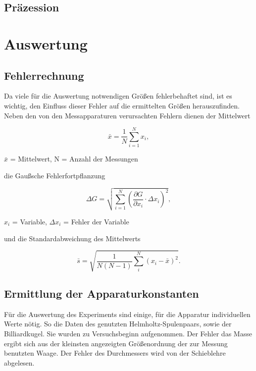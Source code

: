 \subsection{Präzession}



\section{Auswertung}
\subsection{Fehlerrechnung}
Da viele für die Auswertung notwendigen Größen fehlerbehaftet sind, ist es wichtig, den Einfluss dieser Fehler auf die ermittelten
Größen herauszufinden. Neben den von den Messapparaturen verursachten Fehlern dienen der Mittelwert

\begin{formel}
\begin{equation}
 \bar{x} = \frac1N \sum_{i=1}^{N} x_i,
\end{equation}
\caption*{\small{$\bar{x}$ = Mittelwert, N = Anzahl der Messungen}}
\end{formel}

die Gaußsche Fehlerfortpflanzung

\begin{formel}
\begin{equation}
\Delta G = \sqrt{\sum_{i=1}^{N}\left( \frac{\partial G}{\partial x_i}\cdot \Delta x_i\right)^2},
\label{gauss}
\end{equation}
\caption*{$x_i$ = Variable, $\Delta x_i$ = Fehler der Variable}
\end{formel}

und die Standardabweichung des Mittelwerts

\begin{equation}
 \bar s = \sqrt{\frac{1}{N(N-1)} \sum_{i}^{N} (x_i - \bar{x})^2}.
\end{equation}

\subsection{Ermittlung der Apparaturkonstanten}
Für die Auswertung des Experiments sind einige, für die Apparatur individuellen Werte nötig. So die Daten des genutzten Helmholtz-Spulenpaars,
sowie der Billiardkugel. Sie wurden zu Versuchsbeginn aufgenommen. Der Fehler das Masse ergibt sich aus der kleinsten angezeigten Größenordnung
der zur Messung benutzten Waage. Der Fehler des Durchmessers wird von der Schieblehre abgelesen.

